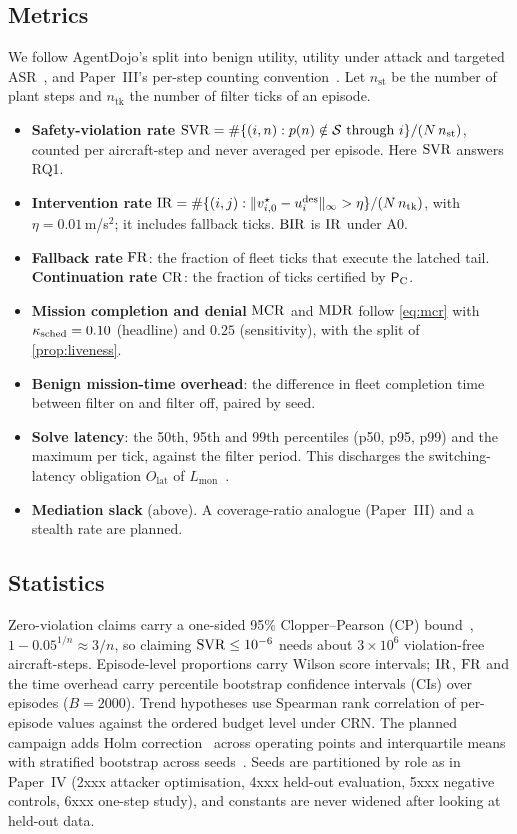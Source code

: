 \subsection{Metrics}\label{sec:metrics}
We follow AgentDojo's split into benign utility, utility under attack and
targeted ASR~\cite{debenedetti2024agentdojo}, and Paper~III's per-step
counting convention~\cite{paperIII}. Let $n_{\mathrm{st}}$ be the number of
plant steps and $n_{\mathrm{tk}}$ the number of filter ticks of an episode.
\begin{itemize}
\item \textbf{Safety-violation rate}
  $\mathrm{SVR}=\#\{(i,n):p(n)\notin\mathcal S\text{ through }i\}/(N\,n_{\mathrm{st}})$,
  counted per aircraft-step and never averaged per episode. Here $\mathrm{SVR}$
  answers RQ1.
\item \textbf{Intervention rate}
  $\mathrm{IR}=\#\{(i,j):\|v^\star_{i,0}-u^{\mathrm{des}}_i\|_\infty>\eta\}/(N\,n_{\mathrm{tk}})$,
  with $\eta=0.01$\,m/s$^2$; it includes fallback ticks. $\mathrm{BIR}$ is $\mathrm{IR}$
  under A0.
\item \textbf{Fallback rate} $\mathrm{FR}$: the fraction of fleet ticks that
  execute the latched tail. \textbf{Continuation rate} $\mathrm{CR}$: the fraction of
  ticks certified by $\mathsf{P}_{\mathrm{C}}$.
\item \textbf{Mission completion and denial} $\mathrm{MCR}$ and $\mathrm{MDR}$ follow
  \eqref{eq:mcr} with $\kappa_{\mathrm{sched}}=0.10$ (headline) and $0.25$ (sensitivity),
  with the split of \cref{prop:liveness}.
\item \textbf{Benign mission-time overhead}: the difference in fleet
  completion time between filter on and filter off, paired by seed.
\item \textbf{Solve latency}: the 50th, 95th and 99th percentiles (p50,
  p95, p99) and the maximum per tick, against the filter period. This
  discharges the switching-latency obligation $O_{\mathrm{lat}}$ of
  $L_{\mathrm{mon}}$~\cite{paperII}.
\item \textbf{Mediation slack} (above). A coverage-ratio analogue (Paper~III)
  and a stealth rate are planned.
\end{itemize}

\subsection{Statistics}
Zero-violation claims carry a one-sided 95\% Clopper--Pearson (CP)
bound~\cite{clopper1934}, $1-0.05^{1/n}\approx3/n$, so claiming
$\mathrm{SVR}\le10^{-6}$ needs about $3\times10^6$ violation-free aircraft-steps.
Episode-level proportions carry Wilson score intervals; $\mathrm{IR}$, $\mathrm{FR}$ and the
time overhead carry percentile bootstrap confidence intervals (CIs) over
episodes ($B=2000$). Trend hypotheses use Spearman rank correlation of
per-episode values against the ordered budget level under CRN. The planned
campaign adds Holm correction~\cite{holm1979} across operating points and
interquartile means with stratified bootstrap across
seeds~\cite{agarwal2021rliable}. Seeds are partitioned by role as in
Paper~IV (2xxx attacker optimisation, 4xxx held-out evaluation, 5xxx
negative controls, 6xxx one-step study), and constants are never widened
after looking at held-out data.

